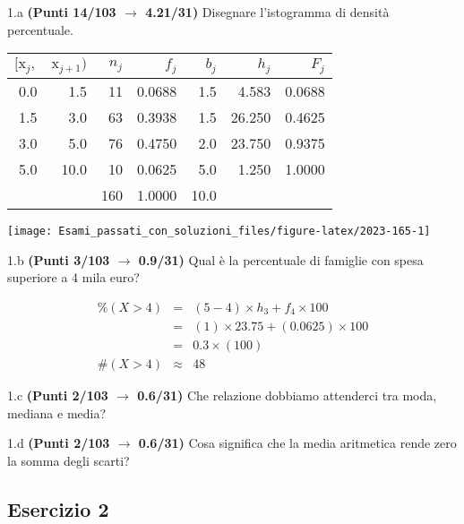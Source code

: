 \documentclass[
  11pt,
]{book}
\theoremstyle{mytheoremstyle}
\theoremstyle{mydefstyle}
\newenvironment{sol}
  {
  \begin{tcolorbox}[enhanced,breakable,arc=0.1mm,boxrule=1pt,colback=white,colframe=iblue,
  title=\bf \fontfamily{lmss}\selectfont \hspace{.5 cm} Soluzione,drop fuzzy shadow]

}{
\end{tcolorbox}
  }
\begin{document}
1.a \textbf{(Punti 14/103 \(\rightarrow\) 4.21/31)} Disegnare l'istogramma di densità percentuale.

\begin{sol}

\begin{table}[H]
\centering
\begin{tabular}{rrrrrrr}
\toprule
$[\text{x}_j,$ & $\text{x}_{j+1})$ & $n_j$ & $f_j$ & $b_j$ & $h_j$ & $F_j$\\
\midrule
0.0 & 1.5 & 11 & 0.0688 & 1.5 & 4.583 & 0.0688\\
1.5 & 3.0 & 63 & 0.3938 & 1.5 & 26.250 & 0.4625\\
3.0 & 5.0 & 76 & 0.4750 & 2.0 & 23.750 & 0.9375\\
5.0 & 10.0 & 10 & 0.0625 & 5.0 & 1.250 & 1.0000\\
 &  & 160 & 1.0000 & 10.0 &  & \\
\bottomrule
\end{tabular}
\end{table}

\begin{center}\texttt{[image: Esami\_passati\_con\_soluzioni\_files/figure-latex/2023-165-1]} \end{center}

\end{sol}

1.b \textbf{(Punti 3/103 \(\rightarrow\) 0.9/31)} Qual è la percentuale di famiglie con spesa superiore a 4 mila euro?

\begin{sol}
\begin{eqnarray*}
     \%(X> 4 ) &=& ( 5 - 4 )\times h_{ 3 }+ f_{ 4 }\times 100 \\
              &=& ( 1 )\times 23.75 + ( 0.0625 )\times 100 \\
              &=&  0.3 \times(100)\\
     \#(X> 4 ) &\approx& 48 
         \end{eqnarray*}

\end{sol}

1.c \textbf{(Punti 2/103 \(\rightarrow\) 0.6/31)} Che relazione dobbiamo attenderci tra moda, mediana e media?

1.d \textbf{(Punti 2/103 \(\rightarrow\) 0.6/31)} Cosa significa che la media aritmetica rende zero la somma degli scarti?

\subsection{Esercizio 2}\label{esercizio-2-26}
\end{document}
